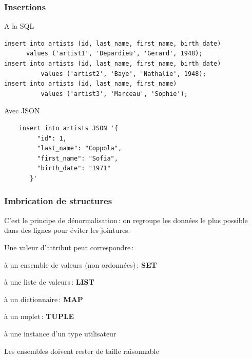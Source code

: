 \begin{frame}[fragile]
\frametitle{Insertions}

A la SQL

\begin{verbatim}
insert into artists (id, last_name, first_name, birth_date)  
      values ('artist1', 'Depardieu', 'Gerard', 1948);
insert into artists (id, last_name, first_name, birth_date)  
          values ('artist2', 'Baye', 'Nathalie', 1948);
insert into artists (id, last_name, first_name)  
          values ('artist3', 'Marceau', 'Sophie');
\end{verbatim}

\vfill

Avec JSON

\begin{verbatim}
    insert into artists JSON '{
         "id": 1,
         "last_name": "Coppola",
         "first_name": "Sofia",
         "birth_date": "1971"
       }' 
\end{verbatim}
\end{frame}



\begin{frame}[fragile]
\frametitle{Imbrication de structures}

C'est le principe de dénormalisation\,: on regroupe 
les données le plus possible dans des lignes pour éviter les jointures.

\vfill

Une valeur d'attribut  peut correspondre\,:
\begin{redbullet}
	\item à un ensemble de valeurs (non ordonnées)\,: \textbf{SET} 
	\item à une liste de valeurs\,: \textbf{LIST}
	\item à un dictionnaire\,: \textbf{MAP} 
	\item à un nuplet\,: \textbf{TUPLE} 
	\item à une instance d'un type utilisateur
\end{redbullet}

\vfill

Les ensembles doivent rester de taille raisonnable
\end{frame}

